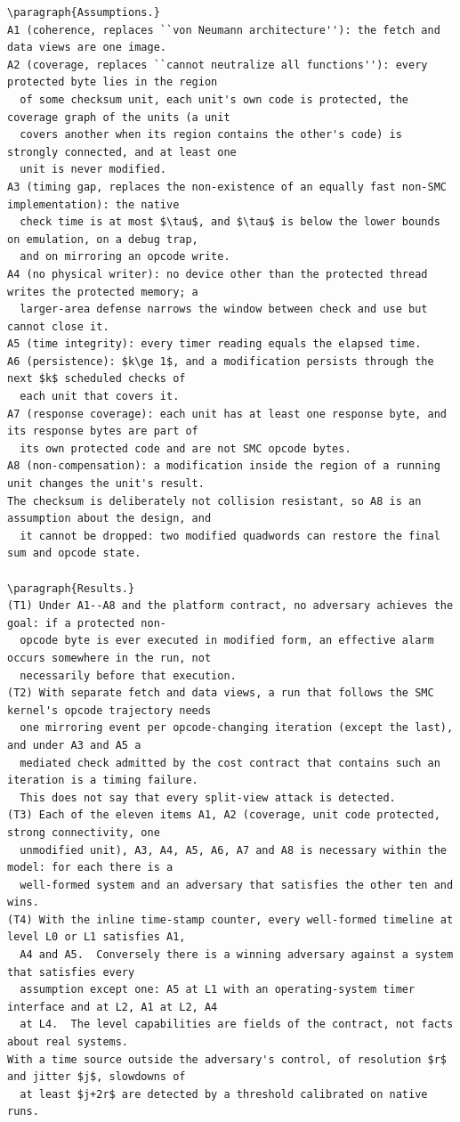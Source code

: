 \documentclass[9pt,twocolumn]{article}
\begin{document}
\begin{small}
\begin{verbatim}
\paragraph{Assumptions.}
A1 (coherence, replaces ``von Neumann architecture''): the fetch and data views are one image.
A2 (coverage, replaces ``cannot neutralize all functions''): every protected byte lies in the region
  of some checksum unit, each unit's own code is protected, the coverage graph of the units (a unit
  covers another when its region contains the other's code) is strongly connected, and at least one
  unit is never modified.
A3 (timing gap, replaces the non-existence of an equally fast non-SMC implementation): the native
  check time is at most $\tau$, and $\tau$ is below the lower bounds on emulation, on a debug trap,
  and on mirroring an opcode write.
A4 (no physical writer): no device other than the protected thread writes the protected memory; a
  larger-area defense narrows the window between check and use but cannot close it.
A5 (time integrity): every timer reading equals the elapsed time.
A6 (persistence): $k\ge 1$, and a modification persists through the next $k$ scheduled checks of
  each unit that covers it.
A7 (response coverage): each unit has at least one response byte, and its response bytes are part of
  its own protected code and are not SMC opcode bytes.
A8 (non-compensation): a modification inside the region of a running unit changes the unit's result.
The checksum is deliberately not collision resistant, so A8 is an assumption about the design, and
  it cannot be dropped: two modified quadwords can restore the final sum and opcode state.

\paragraph{Results.}
(T1) Under A1--A8 and the platform contract, no adversary achieves the goal: if a protected non-
  opcode byte is ever executed in modified form, an effective alarm occurs somewhere in the run, not
  necessarily before that execution.
(T2) With separate fetch and data views, a run that follows the SMC kernel's opcode trajectory needs
  one mirroring event per opcode-changing iteration (except the last), and under A3 and A5 a
  mediated check admitted by the cost contract that contains such an iteration is a timing failure.
  This does not say that every split-view attack is detected.
(T3) Each of the eleven items A1, A2 (coverage, unit code protected, strong connectivity, one
  unmodified unit), A3, A4, A5, A6, A7 and A8 is necessary within the model: for each there is a
  well-formed system and an adversary that satisfies the other ten and wins.
(T4) With the inline time-stamp counter, every well-formed timeline at level L0 or L1 satisfies A1,
  A4 and A5.  Conversely there is a winning adversary against a system that satisfies every
  assumption except one: A5 at L1 with an operating-system timer interface and at L2, A1 at L2, A4
  at L4.  The level capabilities are fields of the contract, not facts about real systems.
With a time source outside the adversary's control, of resolution $r$ and jitter $j$, slowdowns of
  at least $j+2r$ are detected by a threshold calibrated on native runs.


\end{verbatim}
\end{small}
\end{document}
